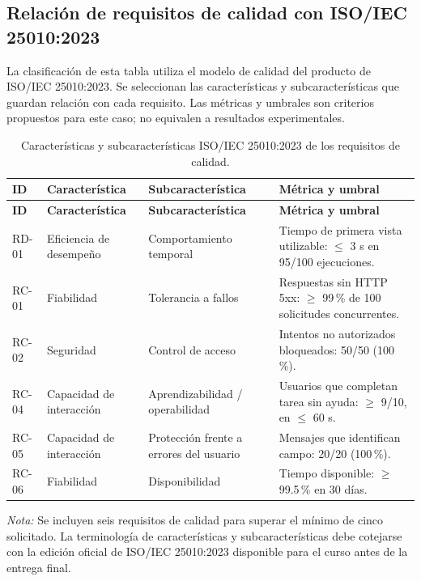 \documentclass[11pt,a4paper]{article}
\begin{document}
\subsection{Relación de requisitos de calidad con ISO/IEC 25010:2023}
La clasificación de esta tabla utiliza el modelo de calidad del producto de ISO/IEC 25010:2023. Se seleccionan las características y subcaracterísticas que guardan relación con cada requisito. Las métricas y umbrales son criterios propuestos para este caso; no equivalen a resultados experimentales.

\begin{longtable}{@{}L{0.08\textwidth} L{0.22\textwidth} L{0.24\textwidth} L{0.30\textwidth}@{}}
\caption{Características y subcaracterísticas ISO/IEC 25010:2023 de los requisitos de calidad.}\label{tab:iso25010}\\
\toprule
\textbf{ID} & \textbf{Característica} & \textbf{Subcaracterística} & \textbf{Métrica y umbral} \\
\midrule
\endfirsthead
\toprule
\textbf{ID} & \textbf{Característica} & \textbf{Subcaracterística} & \textbf{Métrica y umbral} \\
\midrule
\endhead
RD-01 & Eficiencia de desempeño & Comportamiento temporal & Tiempo de primera vista utilizable: $\leq$ 3 s en 95/100 ejecuciones. \\
RC-01 & Fiabilidad & Tolerancia a fallos & Respuestas sin HTTP 5xx: $\geq$ 99\,\% de 100 solicitudes concurrentes. \\
RC-02 & Seguridad & Control de acceso & Intentos no autorizados bloqueados: 50/50 (100\,\%). \\
RC-04 & Capacidad de interacción & Aprendizabilidad / operabilidad & Usuarios que completan tarea sin ayuda: $\geq$ 9/10, en $\leq$ 60 s. \\
RC-05 & Capacidad de interacción & Protección frente a errores del usuario & Mensajes que identifican campo: 20/20 (100\,\%). \\
RC-06 & Fiabilidad & Disponibilidad & Tiempo disponible: $\geq$ 99.5\,\% en 30 días. \\
\bottomrule
\end{longtable}

\textit{Nota:} Se incluyen seis requisitos de calidad para superar el mínimo de cinco solicitado. La terminología de características y subcaracterísticas debe cotejarse con la edición oficial de ISO/IEC 25010:2023 disponible para el curso antes de la entrega final.

\end{document}
